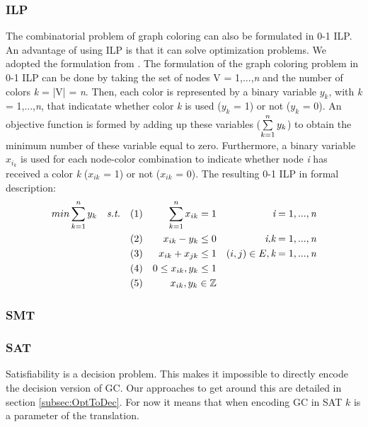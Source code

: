 \documentclass{sig-alternate}
\begin{document}
\subsubsection{ILP}
The combinatorial problem of graph coloring can also be formulated in 0-1 ILP. An advantage of using ILP is that it can solve optimization problems. We adopted the formulation from \cite{faigle2002mathprogramming}. The formulation of the graph coloring problem in 0-1 ILP can be done by taking the set of nodes V = {1,...,\emph{n}} and the number of colors \emph{k} = |V| = \emph{n}. Then, each color is represented by a binary variable \emph{$y_k$}, with \emph{k} = 1,...,\emph{n}, that indicatate whether color \emph{k} is used (\emph{$y_k$} = 1) or not (\emph{$y_k$} = 0). An objective function is formed by adding up these variables ($\sum\limits_{k=1}^n \emph{$y_k$}$) to obtain the minimum number of these variable equal to zero. Furthermore, a binary variable \emph{$x_{i_k}$} is used for each node-color combination to indicate whether node \emph{i} has received a color \emph{k} (\emph{$x_{ik}$} = 1) or not (\emph{$x_{ik}$} = 0). The resulting 0-1 ILP in formal description:
\begin{subequations}
\begin{align*}
        & min \sum\limits_{k=1}^n \emph{$y_k$} & \emph{s.t.} & & (1) & & \sum\limits_{k=1}^n \emph{$x_{ik}$} = 1 & & \emph{i} = 1,...,\emph{n} \\
        &  & & & (2) & & \emph{$x_{ik}$} - \emph{$y_k$} \leq 0 & & \emph{i,k} = 1,...,\emph{n} \\
        &  & & & (3) & &  \emph{$x_{ik}$} + \emph{$x_{jk}$} \leq 1 & & (i,j) \in E, \emph{k} = 1,...,\emph{n} \\
        &  & & & (4) & & 0 \leq \emph{$x_{ik}$}, \emph{$y_k$} \leq 1 & & \\
        &  & & & (5) & & \emph{$x_{ik}$}, \emph{$y_k$} \in \mathbb{Z} & &
\end{align*}
\end{subequations}

\subsubsection{SMT}

\subsubsection*{SAT}

Satisfiability is a decision problem. This makes it impossible to directly encode the decision version of GC. Our approaches to get around this are detailed in section \ref{subsec:OptToDec}. For now it means that when encoding GC in SAT $k$ is a parameter of the translation.
\end{document}
